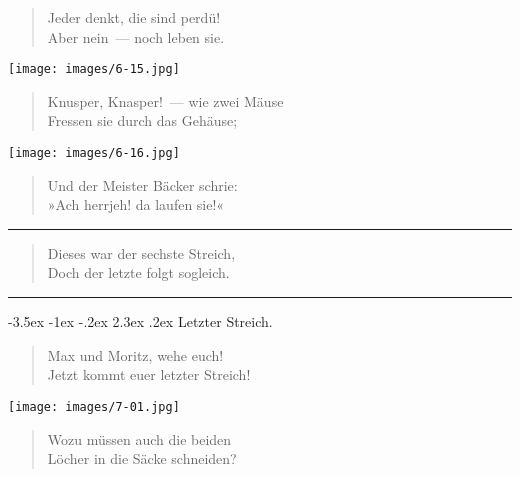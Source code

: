\documentclass[a4paper,12pt]{article}
\makeatletter
\renewcommand\section{\@startsection {section}{1}{\z@}%
                                   {-3.5ex \@plus -1ex \@minus -.2ex}%
                                   {2.3ex \@plus.2ex}%
                                   {\centering\normalfont\LARGE\bfseries}}
\makeatother
\begin{document}
\begin{verse}
Jeder denkt, die sind perdü!\\{}
Aber nein~— noch leben sie.
\end{verse}



\begin{center}\texttt{[image: images/6-15.jpg]}\end{center}



\begin{verse}
Knusper, Knasper!~— wie zwei Mäuse\\{}
Fressen sie durch das Gehäuse;
\end{verse}



\begin{center}\texttt{[image: images/6-16.jpg]}\end{center}



\begin{verse}
Und der Meister Bäcker schrie:\\{}
»Ach herrjeh! da laufen sie!«
\end{verse}


\hrule


\begin{verse}
Dieses war der sechste Streich,\\{}
Doch der letzte folgt sogleich.
\end{verse}


\hrule


\clearpage
\section{Letzter Streich.\label{Letzter_Streich}}


\begin{verse}
Max und Moritz, wehe euch!\\{}
Jetzt kommt euer letzter Streich!
\end{verse}



\begin{center}\texttt{[image: images/7-01.jpg]}\end{center}



\begin{verse}
Wozu müssen auch die beiden\\{}
Löcher in die Säcke schneiden?
\end{verse}
\end{document}
